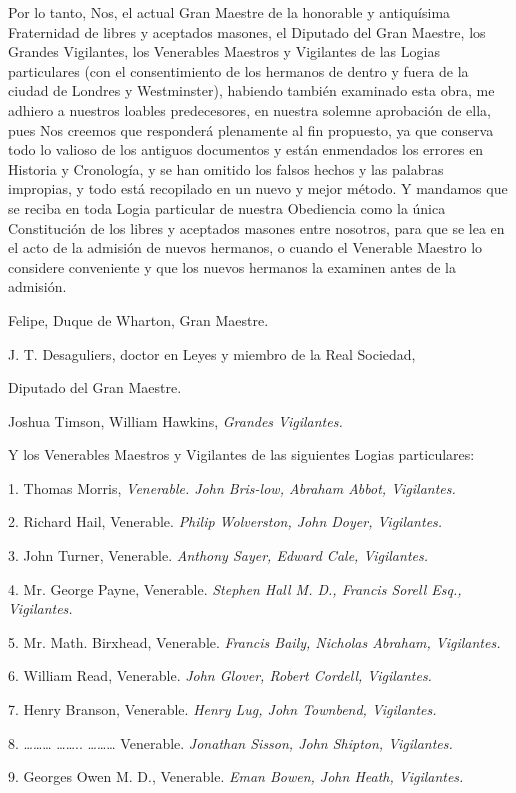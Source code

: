 \documentclass[a4paper,12pt,twoside]{book}
\begin{document}
Por lo tanto, Nos, el actual Gran Maestre de la honorable y antiquísima Fraternidad de libres y aceptados masones, el Diputado del Gran Maestre, los Grandes Vigilantes, los Venerables Maestros y Vigilantes de las Logias particulares (con el consentimiento de los hermanos de dentro y fuera de la ciudad de Londres y Westminster), habiendo también examinado esta obra, me adhiero a nuestros loables predecesores, en nuestra solemne aprobación de ella, pues Nos creemos que responderá plenamente al fin propuesto, ya que conserva todo lo valioso de los antiguos documentos y están enmendados los errores en Historia y Cronología, y se han omitido los falsos hechos y las palabras impropias, y todo está recopilado en un nuevo y mejor método. Y mandamos que se reciba en toda Logia particular de nuestra Obediencia como la única Constitución de los libres y aceptados masones entre nosotros, para que se lea en el acto de la admisión de nuevos hermanos, o cuando el Venerable Maestro lo considere conveniente y que los nuevos hermanos la examinen antes de la admisión.  

Felipe, Duque de Wharton, Gran Maestre.  

J. T. Desaguliers, doctor en Leyes y miembro de la Real Sociedad, 

Diputado del Gran Maestre. 

Joshua Timson, William Hawkins, \textit{Grandes Vigilantes.} 

Y los Venerables Maestros y Vigilantes de las siguientes Logias particulares: 

1. Thomas Morris, \textit{Venerable. John Bris-low, Abraham Abbot, Vigilantes.} 

2. Richard Hail, Venerable. \textit{Philip Wolverston, John Doyer, Vigilantes.} 

3. John Turner, Venerable. \textit{Anthony Sayer, Edward Cale, Vigilantes.} 

4. Mr. George Payne, Venerable. \textit{Stephen Hall M. D., Francis Sorell Esq., Vigilantes.} 

5. Mr. Math. Birxhead, Venerable. \textit{Francis Baily, Nicholas Abraham, Vigilantes.} 

6. William Read, Venerable. \textit{John Glover, Robert Cordell, Vigilantes.} 

7. Henry Branson, Venerable. \textit{Henry Lug, John Townbend, Vigilantes.} 

8. ………  ……..  ………  Venerable. \textit{Jonathan Sisson, John Shipton, Vigilantes.} 

9. Georges Owen M. D., Venerable. \textit{Eman Bowen, John Heath, Vigilantes.} 
\end{document}
